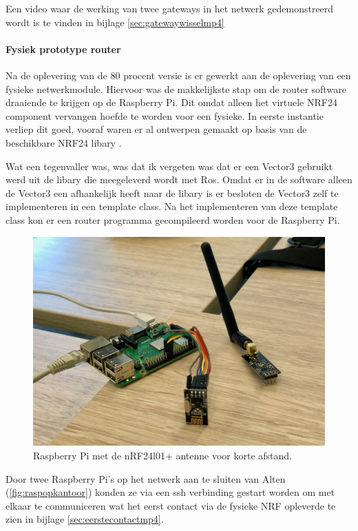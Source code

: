 \documentclass[a4paper, 11pt, oneside]{report}
\begin{document}
Een video waar de werking van twee gateways in het netwerk gedemonstreerd wordt is te vinden in bijlage  \ref{sec:gatewaywisselmp4}

\paragraph{Fysiek prototype router}
Na de oplevering van de 80 procent versie is er gewerkt aan de oplevering van een fysieke netwerkmodule.
Hiervoor was de makkelijkste stap om de router software draaiende te krijgen op de Raspberry Pi.
Dit omdat alleen het virtuele NRF24 component vervangen hoefde te worden voor een fysieke.
In eerste instantie verliep dit goed, vooraf waren er al ontwerpen gemaakt op basis van de beschikbare NRF24 libary \cite{nrf24git}.

Wat een tegenvaller was, was dat ik vergeten was dat er een Vector3 gebruikt werd uit de libary die meegeleverd wordt met Ros.
Omdat er in de software alleen de Vector3 een afhankelijk heeft naar de libary is er besloten de Vector3 zelf te implementeren in een template class.
Na het implementeren van deze template class kon er een router programma gecompileerd worden voor de Raspberry Pi.

\begin{figure}[H]
	\begin{center}\includegraphics[width=.7\linewidth]{Afbeeldingen/raspberryOpKantoor.jpg}\end{center}
	\caption{Raspberry Pi met de nRF24l01+ antenne voor korte afstand.}
	\label{fig:raspopkantoor}
\end{figure}

Door twee Raspberry Pi's op het netwerk aan te sluiten van Alten (\autoref{fig:raspopkantoor}) konden ze via een ssh verbinding gestart worden om met elkaar te communiceren wat het eerst contact via de fysieke NRF opleverde te zien in bijlage \ref{sec:eerstecontactmp4}.
\end{document}
